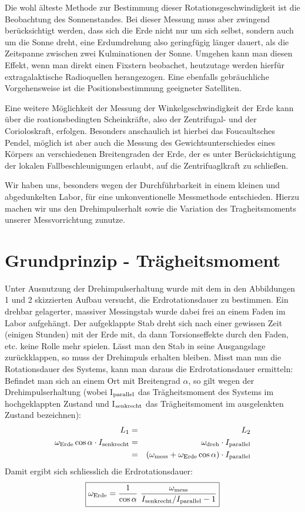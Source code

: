 \documentclass[11pt]{scrartcl}
\newcommand{\ltext}[1]{\ensuremath{_{\textnormal{#1}}}}
\begin{document}
Die wohl älteste Methode zur Bestimmung dieser Rotationsgeschwindigkeit ist die Beobachtung des Sonnenstandes.
Bei dieser Messung muss aber zwingend berücksichtigt werden, dass sich die Erde nicht nur um sich selbst, sondern auch um die Sonne dreht, eine Erdumdrehung also geringfügig länger dauert, als die Zeitspanne zwischen zwei Kulminationen der Sonne. Umgehen kann man diesen Effekt, wenn man direkt einen Fixstern beobachet, heutzutage werden hierfür extragalaktische Radioquellen herangezogen. Eine ebenfalls gebräuchliche Vorgehensweise ist die Positionsbestimmung geeigneter Satelliten.

Eine weitere Möglichkeit der Messung der Winkelgeschwindigkeit der Erde kann über die roationsbedingten Scheinkräfte, also der Zentrifugal- und der Corioloskraft, erfolgen. Besonders anschaulich ist hierbei das Foucaultsches Pendel, möglich ist aber auch die Messung des Gewichtsunterschiedes eines Körpers an verschiedenen Breitengraden der Erde, der es unter Berücksichtigung der lokalen Fallbeschleunigungen erlaubt, auf die Zentrifuaglkraft zu schließen. 

Wir haben uns, besonders wegen der Durchführbarkeit in einem kleinen und abgedunkelten Labor, für eine unkonventionelle Messmethode entschieden. Hierzu machen wir uns den Drehimpulserhalt sowie die Variation des Tragheitsmoments unserer Messvorrichtung zunutze.

\section{Grundprinzip - Tr\"agheitsmoment}
Unter Ausnutzung der Drehimpulserhaltung wurde mit dem in den Abbildungen 1 und 2 skizzierten Aufbau versucht, die Erdrotationsdauer zu bestimmen. Ein drehbar gelagerter, massiver Messingstab wurde dabei frei an einem Faden im Labor aufgeh\"angt. Der aufgeklappte Stab dreht sich nach einer gewissen Zeit (einigen Stunden) mit der Erde mit, da dann Torsionseffekte durch den Faden, etc. keine Rolle mehr spielen. L\"asst man den Stab in seine Ausgangslage zur\"uckklappen, so muss der Drehimpuls erhalten bleiben. Misst man nun die Rotationsdauer des Systems, kann man daraus die Erdrotationsdauer ermitteln:
Befindet man sich an einem Ort mit Breitengrad $\alpha$, so gilt wegen der Drehimpulserhaltung (wobei I\ltext{parallel} das Tr\"agheitsmoment des Systems im hochgeklappten Zustand und I\ltext{senkrecht} das Tr\"agheitsmoment im ausgelenkten Zustand bezeichnen):
\begin{eqnarray}
L_1 &=& L_2 \\
\omega\ltext{Erde}\cos\alpha \cdot I\ltext{senkrecht} &=&
\omega\ltext{dreh} \cdot I\ltext{parallel} \\
&=& (\omega\ltext{mess} + \omega\ltext{Erde}\cos\alpha) \cdot I\ltext{parallel}
\end{eqnarray}
Damit ergibt sich schliesslich die Erdrotationsdauer:
\begin{equation}
\boxed{
\omega\ltext{Erde} =
\frac{1}{\cos\alpha}\ 
\frac{\omega\ltext{mess}}{I\ltext{senkrecht} / I\ltext{parallel} - 1}
}
\end{equation}
\end{document}
